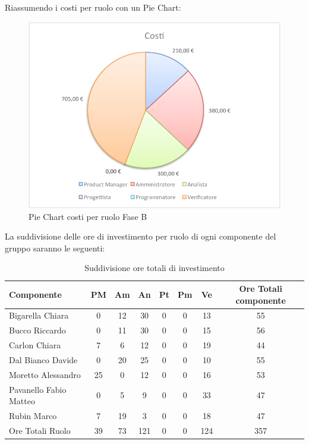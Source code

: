				Riassumendo i costi per ruolo con un Pie Chart:
				\begin{figure}[H]\centering
					\includegraphics[width=\textwidth]{PianoDiProgetto/Pics/ChartTotCostiFaseB.pdf}
					\caption{Pie Chart costi per ruolo Fase B}
				\end{figure}		
				La suddivisione delle ore di investimento per ruolo di ogni componente del gruppo \groupname{} saranno le seguenti:
				\begin{table}[H]
					\begin{center}
						\begin{tabular}{| l | c | c | c | c | c | c | c |}
							\hline
							Componente 				& PM	& Am 	& An 	& Pt 		& Pm 	& Ve 	& Ore Totali componente \\ \hline
							
							Bigarella Chiara 			& 0		& 12 		& 30 		& 0		& 0		& 13 		& 55 \\
							Bucco Riccardo 				& 0		& 11 		& 30 		& 0		& 0		& 15 		& 56 \\
							Carlon Chiara	 			& 7 	& 6 		& 12 		& 0		& 0		& 19 		& 44 \\
							Dal Bianco Davide 			& 0		& 20 		& 25 		& 0		& 0		& 10 		& 55 \\
							Moretto Alessandro 			& 25 	& 0			& 12 		& 0		& 0		& 16 		& 53 \\
							Pavanello Fabio Matteo	 	& 0		& 5 		& 9 		& 0		& 0		& 33 		& 47 \\
							Rubin Marco					& 7 	& 19 		& 3 		& 0		& 0		& 18 		& 47 \\ \hline \hline
							
							Ore Totali Ruolo 			& 39 	& 73 		& 121	 	& 0		& 0		& 124 		& 357\\ \hline
						\end{tabular}
					\end{center}
					\caption{Suddivisione ore totali di investimento}
				\end{table}
